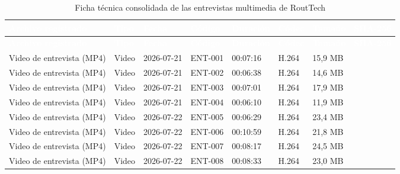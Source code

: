 \documentclass[12pt,a4paper]{article}
\begin{document}
\begin{landscape}
\scriptsize
\setlength{\tabcolsep}{3.5pt}
\begin{longtable}{L{3.35cm} L{1.35cm} L{1.90cm} L{1.55cm} L{1.65cm} L{1.45cm} L{1.75cm} L{6.50cm}}
\caption{Ficha técnica consolidada de las entrevistas multimedia de RoutTech}\label{tab:plantilla-ficha-tecnica}\\
\textcolor{white}{\textbf{Archivo registrado}} &
\textcolor{white}{\textbf{Tipo}} &
\textcolor{white}{\textbf{Fecha}} &
\textcolor{white}{\textbf{Código}} &
\textcolor{white}{\textbf{Duración}} &
\textcolor{white}{\textbf{Códec}} &
\textcolor{white}{\textbf{Tamaño}} &
\textcolor{white}{\textbf{SHA-256}}\\
\endfirsthead
{}
\textcolor{white}{\textbf{Archivo registrado}} &
\textcolor{white}{\textbf{Tipo}} &
\textcolor{white}{\textbf{Fecha}} &
\textcolor{white}{\textbf{Código}} &
\textcolor{white}{\textbf{Duración}} &
\textcolor{white}{\textbf{Códec}} &
\textcolor{white}{\textbf{Tamaño}} &
\textcolor{white}{\textbf{SHA-256}}\\
\endhead
Video de entrevista (MP4) & Video & 2026-07-21 & ENT-001 & 00:07:16 & H.264 & 15,9 MB & \\
Video de entrevista (MP4) & Video & 2026-07-21 & ENT-002 & 00:06:38 & H.264 & 14,6 MB & \\
Video de entrevista (MP4) & Video & 2026-07-21 & ENT-003 & 00:07:01 & H.264 & 17,9 MB & \\
Video de entrevista (MP4) & Video & 2026-07-21 & ENT-004 & 00:06:10 & H.264 & 11,9 MB & \\
Video de entrevista (MP4) & Video & 2026-07-22 & ENT-005 & 00:06:29 & H.264 & 23,4 MB & \\
Video de entrevista (MP4) & Video & 2026-07-22 & ENT-006 & 00:10:59 & H.264 & 21,8 MB & \\
Video de entrevista (MP4) & Video & 2026-07-22 & ENT-007 & 00:08:17 & H.264 & 24,5 MB & \\
Video de entrevista (MP4) & Video & 2026-07-22 & ENT-008 & 00:08:33 & H.264 & 23,0 MB & \\

\end{longtable}
\end{landscape}
\end{document}
